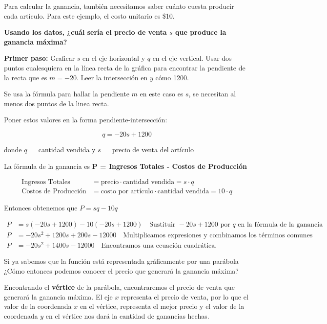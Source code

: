 \documentclass[12pt,a4paper]{article}
\begin{document}
Para calcular la ganancia, también necesitamos saber cuánto cuesta producir cada artículo. Para este ejemplo, el costo unitario es \$10.

\textbf{Usando los datos, ¿cuál sería el precio de venta $s$ que produce la ganancia máxima?}

\textbf{Primer paso:} Graficar $s$ en el eje horizontal y $q$ en el eje vertical. Usar dos puntos cualesquiera en la línea recta de la gráfica para encontrar la pendiente de la recta que es $m = -20$. Leer la intersección en $y$ cómo 1200.

Se usa la fórmula para hallar la pendiente $m$ en este caso es $s$, se necesitan al menos dos puntos de la linea recta.

Poner estos valores en la forma pendiente-intersección:

$$q = -20s + 1200$$

donde $q =$ cantidad vendida y $s =$ precio de venta del artículo

La fórmula de la ganancia es \textbf{P = Ingresos Totales - Costos de Producción}

\begin{align*}
\text{Ingresos Totales} &= \text{precio} \cdot \text{cantidad vendida} = s \cdot q \\
\text{Costos de Producción} &= \text{costo por artículo} \cdot \text{cantidad vendida} = 10 \cdot q
\end{align*}

Entonces obtenemos que $P = sq - 10q$

\begin{align*}
P &= s(-20s + 1200) - 10(-20s + 1200) \quad \text{Sustituir } -20s + 1200 \text{ por } q \text{ en la fórmula de la ganancia} \\
P &= -20s^2 + 1200s + 200s - 12000 \quad \text{Multiplicamos expresiones y combinamos los términos comunes} \\
P &= -20s^2 + 1400s - 12000 \quad \text{Encontramos una ecuación cuadrática.}
\end{align*}

Si ya sabemos que la función está representada gráficamente por una parábola ¿Cómo entonces podemos conocer el precio que generará la ganancia máxima?

Encontrando el \textbf{vértice} de la parábola, encontraremos el precio de venta que generará la ganancia máxima. El eje $x$ representa el precio de venta, por lo que el valor de la coordenada $x$ en el vértice, representa el mejor precio y el valor de la coordenada $y$ en el vértice nos dará la cantidad de ganancias hechas.
\end{document}
